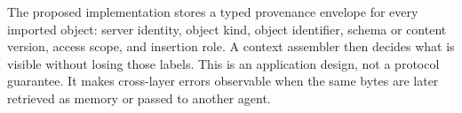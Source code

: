 The proposed implementation stores a typed provenance envelope for every imported object: server identity, object kind, object identifier, schema or content version, access scope, and insertion role. A context assembler then decides what is visible without losing those labels. This is an application design, not a protocol guarantee. It makes cross-layer errors observable when the same bytes are later retrieved as memory or passed to another agent.

